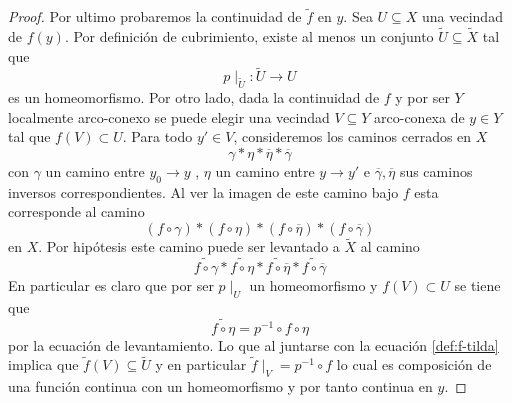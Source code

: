 \begin{proof}
  Por ultimo probaremos la continuidad de \(\tilde f\) en \(y\). Sea \(U
  \subseteq X\) una vecindad de \(f (y)\). Por definición de cubrimiento,
  existe al menos un conjunto \(\tilde U \subseteq \tilde X\) tal que
  \[p \mid_{\tilde U} : \tilde U \to U\]
  es un homeomorfismo. Por otro lado, dada la continuidad de \(f\) y
  por ser \(Y\) localmente arco-conexo se puede elegir una vecindad \(V
  \subseteq Y\) arco-conexa de \(y \in Y\) tal que \(f (V) \subset U\).
  Para todo \(y' \in V\), consideremos los caminos cerrados en \(X\)
  \[ \gamma * \eta * \overline{\eta} * \overline{\gamma} \]
  con \(\gamma\) un camino entre \(y_0 \to y\) , \(\eta\) un camino
  entre \(y \to y'\) e \(\overline \gamma, \overline \eta\) sus caminos
  inversos correspondientes. Al ver la imagen de este camino bajo \(f\)
  esta corresponde al camino
  \[ (f \circ \gamma) * (f \circ \eta) * (f \circ \overline{\eta}) * (f
    \circ \overline{\gamma}) \]
  en \(X\). Por hipótesis este camino puede ser levantado a
  \(\tilde X\) al camino
  \[ \widetilde{f \circ \gamma} * \widetilde{f \circ \eta} *
    \widetilde{f \circ \overline{\eta}} * \widetilde{f \circ
    \overline{\gamma}} \]
  En particular es claro que por ser \(p \mid_U\) un homeomorfismo y \(f
  (V) \subset U\) se tiene que
  \[ \widetilde{f \circ \eta} = p^{-1} \circ f \circ \eta \]
  por la ecuación de levantamiento. Lo que al juntarse con la ecuación
  \eqref{def:f-tilda} implica que \(\tilde f (V) \subseteq \tilde U\) y en
  particular \( \tilde f \mid _{V} = p^{-1} \circ f \) lo cual es
  composición de una función continua con un homeomorfismo y por tanto
  continua en \(y\).
\end{proof}

